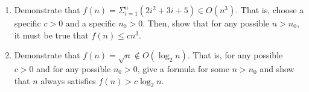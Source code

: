 \documentclass{article}
\begin{document}
\begin{enumerate}
\begin{enumerate}
  \item Demonstrate that
    \(f(n) = \Sigma_{i=1}^{n} (2i^2+3i+5) \in O(n^3)\).
    That is, choose a specific \(c>0\) and a specific \(n_0 > 0\).
    Then, show that for any possible \(n > n_0\), it must be true that
    \(f(n) \leq c n^3\).

  \item Demonstrate that
    \(f(n) = \sqrt{n} \not\in O(\log_2 n)\).
    That is, for any possible \(c>0\) and for any possible \(n_0 > 0\), give a
    formula for some \(n > n_0\) and show that \(n\) always satisfies
    \(f(n) > c \log_2 n\).

  \end{enumerate}

\end{enumerate}
\end{document}
